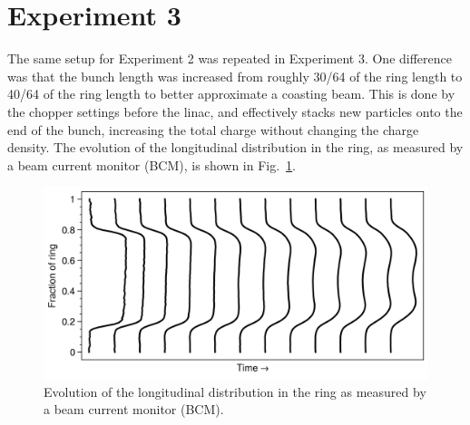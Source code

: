 \section{Experiment 3}

The same setup for Experiment 2 was repeated in Experiment 3. One difference was that the bunch length was increased from roughly 30/64 of the ring length to 40/64 of the ring length to better approximate a coasting beam. This is done by the chopper settings before the linac, and effectively stacks new particles onto the end of the bunch, increasing the total charge without changing the charge density. The evolution of the longitudinal distribution in the ring, as measured by a beam current monitor (BCM), is shown in Fig.~\ref{fig:bcm_waterfall}.
%
\begin{figure}[!p]
    \centering
    \includegraphics[width=\textwidth]{Images/chapter5/exp3/bcm_waterfall.png}
    \caption{Evolution of the longitudinal distribution in the ring as measured by a beam current monitor (BCM).}
    \label{fig:bcm_waterfall}
\end{figure}
%

